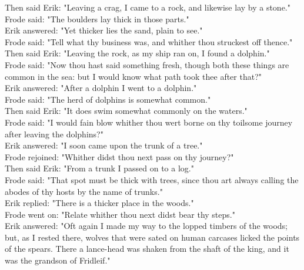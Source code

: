 \documentclass[10pt,a4paper]{report}
\begin{document}
Then said Erik: "Leaving a crag, I came to a rock, and likewise lay by a stone."\\

Frode said: "The boulders lay thick in those parts."\\

Erik answered: "Yet thicker lies the sand, plain to see."\\

Frode said: "Tell what thy business was, and whither thou struckest off thence."\\

Then said Erik: "Leaving the rock, as my ship ran on, I found a dolphin."\\

Frode said: "Now thou hast said something fresh, though both these things are common in the sea: but I would know what path took thee after that?"\\

Erik answered: "After a dolphin I went to a dolphin."\\

Frode said: "The herd of dolphins is somewhat common."\\

Then said Erik: "It does swim somewhat commonly on the waters."\\

Frode said: "I would fain blow whither thou wert borne on thy toilsome journey after leaving the dolphins?"\\

Erik answered: "I soon came upon the trunk of a tree."\\

Frode rejoined: "Whither didst thou next pass on thy journey?"\\

Then said Erik: "From a trunk I passed on to a log."\\

Frode said: "That spot must be thick with trees, since thou art always calling the abodes of thy hosts by the name of trunks."\\

Erik replied: "There is a thicker place in the woods."\\

Frode went on: "Relate whither thou next didst bear thy steps."\\

Erik answered: "Oft again I made my way to the lopped timbers of the woods; but, as I rested there, wolves that were sated on human carcases licked the points of the spears. There a lance-head was shaken from the shaft of the king, and it was the grandson of Fridleif."\\
\end{document}
